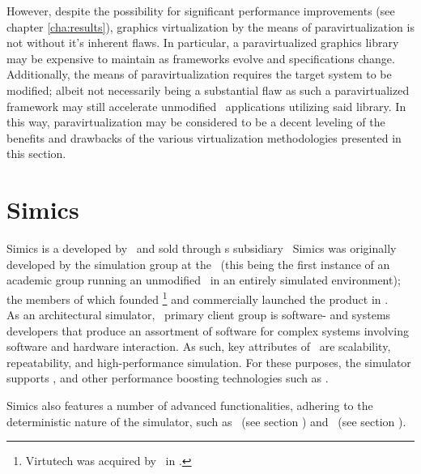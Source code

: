 However, despite the possibility for significant performance improvements (see chapter \ref{cha:results}), graphics virtualization by the means of paravirtualization is not without it's inherent flaws.
In particular, a paravirtualized graphics library may be expensive to maintain as frameworks evolve and specifications change.
Additionally, the means of paravirtualization requires the target system to be modified; albeit not necessarily being a substantial flaw as such a paravirtualized framework may still accelerate unmodified \dvttermtarget\ applications utilizing said library.
In this way, paravirtualization may be considered to be a decent leveling of the benefits and drawbacks of the various virtualization methodologies presented in this section.


\section{Simics}
\label{sec:background_simics}
Simics is a  developed by \dvttermintel\ and sold through \dvttermintel s subsidiary \dvttermwindriver\
Simics was originally developed by the simulation group at the \dvttermsics\ (this being the first instance of an academic group running an unmodified \dvttermos\ in an entirely simulated environment); the members of which founded \dvttermvirtutech \footnote{Virtutech was acquired by \dvttermintel\ in .} and commercially launched the product in .\\

\noindent
As an architectural simulator, \dvttermsimics\ primary client group is software- and systems developers that produce an assortment of software for complex systems involving software and hardware interaction.
As such, key attributes of \dvttermsimics\ are scalability, repeatability, and high-performance simulation.
For these purposes, the simulator supports \dvttermhostvirtualizationextensions , and other performance boosting technologies such as \dvttermhypersimulation {}.

Simics also features a number of advanced functionalities, adhering to the deterministic nature of the simulator, such as \dvttermcheckpointing\ (see section ) and \dvttermreverseexecution\ (see section ).\\

